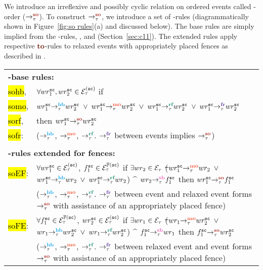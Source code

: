 We introduce an irreflexive and possibly cyclic relation
on \sc ordered events called \sc-order ($\setSO$).
%
To construct $\setSO$, we introduce a set of \lso-rules
(diagrammatically shown in Figure~\ref{fig:so rules}(a) and
discussed below).
%
The \lso base rules are simply implied from
the \lto-rules, ,   
and  (Section~\ref{sec:c11}).
%
The extended rules apply respective $\lto$-rules to relaxed
events with appropriately placed fences as described in
\cc \cite{C11}\cite{Batty-POPL12}.


\begin{longtable}{|p{} p{}|}
	\hline
	\multicolumn{2}{|l|}{\bf \lso-base rules:}\\
	
	\hl{sohb}, & 
	$\forall wr^{\texttt{sc}}_1, wr^{\texttt{sc}}_2 \in \mathcal{E}^{(\texttt{sc})}_\tau$ if \\
	\hl{somo}, &
	$\hb{\tau}{wr^{\sc}_1}{wr^{\sc}_2}$ $\vee$ $\mo{\tau}{wr^{\sc}_1}{wr^{\sc}_2}$
	$\vee$ $\rf{\tau}{wr^{\sc}_1}{wr^{\sc}_2}$ 
	$\vee$ $\fr{\tau}{wr^{\sc}_1}{wr^{\sc}_2}$\\
	\hl{sorf}, & 
	then $\so{\tau}{wr^{\sc}_1}{wr^{\sc}_2}$ \\
	\hl{sofr}: & ($\setHB$, $\setMO$, $\setRF$. $\setFR$ between \sc events 
				implies $\setSO$) \\
	& \\
	
	\multicolumn{2}{|l|}{\bf \lso-rules extended for fences:} \\
	
	\hl{soEF}: & $\forall wr^\texttt{sc}_1 \in \mathcal{E}^{(\texttt{sc})}_\tau$, $f^\texttt{sc}_1 \in
	\mathcal{E}^{\mathbb{F}(\texttt{sc})}_\tau$ if $\exists wr_2 \in \mathcal{E}_\tau$ \st 
	($\mo{\tau}{wr^\sc_1}{wr_2}$ $\vee$ $\hb{\tau}{wr^\sc_1}{wr_2}$
	$\vee$ $\rf{\tau}{wr^\sc_1}{wr_2}$) $\^$ $\seqb{\tau}{wr_2}{f^\sc_1}$ 
	then $\so{\tau}{wr^\sc_1}{f^\sc_1}$ \\
	& ($\setHB$, $\setMO$, $\setRF$. $\setFR$ between \sc event and relaxed 
		event forms $\setSO$ with assistance of an appropriately placed 
		fence) \\
	
	\hl{soFE}: & $\forall f^\texttt{sc}_1 \in \mathcal{E}^{\mathbb{F}(\texttt{sc})}_\tau$, $wr^\texttt{sc}_2 \in
	\mathcal{E}^{(\texttt{sc})}_\tau$ if $\exists wr_1 \in \mathcal{E}_\tau$ \st 
	($\mo{\tau}{wr_1}{wr^\sc_2}$ $\vee$ $\hb{\tau}{wr_1}{wr^\sc_2}$
	$\vee$ $\rf{\tau}{wr_1}{wr^\sc_2}$) $\^$ $\seqb{\tau}{f^\sc_1}{wr_1}$ 
	then $\so{\tau}{f^\sc_1}{wr^\sc_2}$ \\
	& ($\setHB$, $\setMO$, $\setRF$. $\setFR$ between relaxed event and
	\sc event forms $\setSO$ with assistance of an appropriately placed 
	fence) \\
	

\end{longtable}
